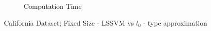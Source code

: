 \begin{figure}[!htpb]
\begin{subfigure}[b]{0.34\textwidth}
		\caption{Computation Time}\label{fig:cali_3}
	\end{subfigure}%
	\caption{California Dataset; Fixed Size - LSSVM vs $l_0$ - type approximation}
	\label{fig:cali}
\end{figure}
